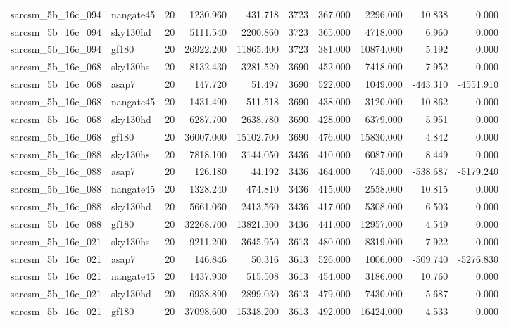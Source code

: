\documentclass{article}
\begin{document}
\begin{longtable}{llrrrrrrrr}
sarcsm\_5b\_16c\_094 & nangate45 & 20 & 1230.960 & 431.718 & 3723 & 367.000 & 2296.000 & 10.838 & 0.000 \\
sarcsm\_5b\_16c\_094 & sky130hd & 20 & 5111.540 & 2200.860 & 3723 & 365.000 & 4718.000 & 6.960 & 0.000 \\
sarcsm\_5b\_16c\_094 & gf180 & 20 & 26922.200 & 11865.400 & 3723 & 381.000 & 10874.000 & 5.192 & 0.000 \\
sarcsm\_5b\_16c\_068 & sky130hs & 20 & 8132.430 & 3281.520 & 3690 & 452.000 & 7418.000 & 7.952 & 0.000 \\
sarcsm\_5b\_16c\_068 & asap7 & 20 & 147.720 & 51.497 & 3690 & 522.000 & 1049.000 & -443.310 & -4551.910 \\
sarcsm\_5b\_16c\_068 & nangate45 & 20 & 1431.490 & 511.518 & 3690 & 438.000 & 3120.000 & 10.862 & 0.000 \\
sarcsm\_5b\_16c\_068 & sky130hd & 20 & 6287.700 & 2638.780 & 3690 & 428.000 & 6379.000 & 5.951 & 0.000 \\
sarcsm\_5b\_16c\_068 & gf180 & 20 & 36007.000 & 15102.700 & 3690 & 476.000 & 15830.000 & 4.842 & 0.000 \\
sarcsm\_5b\_16c\_088 & sky130hs & 20 & 7818.100 & 3144.050 & 3436 & 410.000 & 6087.000 & 8.449 & 0.000 \\
sarcsm\_5b\_16c\_088 & asap7 & 20 & 126.180 & 44.192 & 3436 & 464.000 & 745.000 & -538.687 & -5179.240 \\
sarcsm\_5b\_16c\_088 & nangate45 & 20 & 1328.240 & 474.810 & 3436 & 415.000 & 2558.000 & 10.815 & 0.000 \\
sarcsm\_5b\_16c\_088 & sky130hd & 20 & 5661.060 & 2413.560 & 3436 & 417.000 & 5308.000 & 6.503 & 0.000 \\
sarcsm\_5b\_16c\_088 & gf180 & 20 & 32268.700 & 13821.300 & 3436 & 441.000 & 12957.000 & 4.549 & 0.000 \\
sarcsm\_5b\_16c\_021 & sky130hs & 20 & 9211.200 & 3645.950 & 3613 & 480.000 & 8319.000 & 7.922 & 0.000 \\
sarcsm\_5b\_16c\_021 & asap7 & 20 & 146.846 & 50.316 & 3613 & 526.000 & 1006.000 & -509.740 & -5276.830 \\
sarcsm\_5b\_16c\_021 & nangate45 & 20 & 1437.930 & 515.508 & 3613 & 454.000 & 3186.000 & 10.760 & 0.000 \\
sarcsm\_5b\_16c\_021 & sky130hd & 20 & 6938.890 & 2899.030 & 3613 & 479.000 & 7430.000 & 5.687 & 0.000 \\
sarcsm\_5b\_16c\_021 & gf180 & 20 & 37098.600 & 15348.200 & 3613 & 492.000 & 16424.000 & 4.533 & 0.000 \\

\end{longtable}
\end{document}
